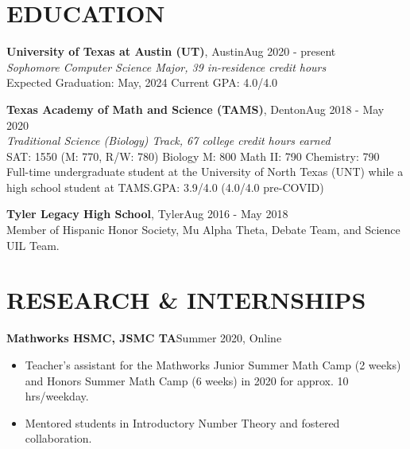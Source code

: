 \documentclass[margin]{res}
\begin{document}
\begin{resume}


\section{EDUCATION}
\textbf{University of Texas at Austin (UT)}, Austin\hfill Aug 2020 - present\\
{\sl Sophomore Computer Science Major, 39 in-residence credit hours}\\
Expected Graduation: May, 2024 \hfill Current GPA: 4.0/4.0

\textbf{Texas Academy of Math and Science (TAMS)}, Denton\hfill Aug 2018 - May 2020\\
{\sl Traditional Science (Biology) Track, 67 college credit hours earned}\\
SAT: 1550 (M: 770, R/W: 780) \textbullet{} Biology M: 800 \textbullet{} Math II: 790 \textbullet{} Chemistry: 790\\
Full-time undergraduate student at the University of North Texas (UNT) while a high school student at TAMS.\hfill GPA: 3.9/4.0 (4.0/4.0 pre-COVID)

\textbf{Tyler Legacy High School}, Tyler\hfill Aug 2016 - May 2018\\
Member of Hispanic Honor Society, Mu Alpha Theta, Debate Team, and Science UIL Team.\\


\section{RESEARCH \& INTERNSHIPS}
\textbf{Mathworks HSMC, JSMC TA}\hfill Summer 2020, Online
\begin{itemize}
\item Teacher's assistant for the Mathworks Junior Summer Math Camp (2 weeks) and Honors Summer Math Camp (6 weeks) in 2020 for approx. 10 hrs/weekday.
\item Mentored students in Introductory Number Theory and fostered collaboration.
\end{itemize}


\end{resume}
\end{document}
